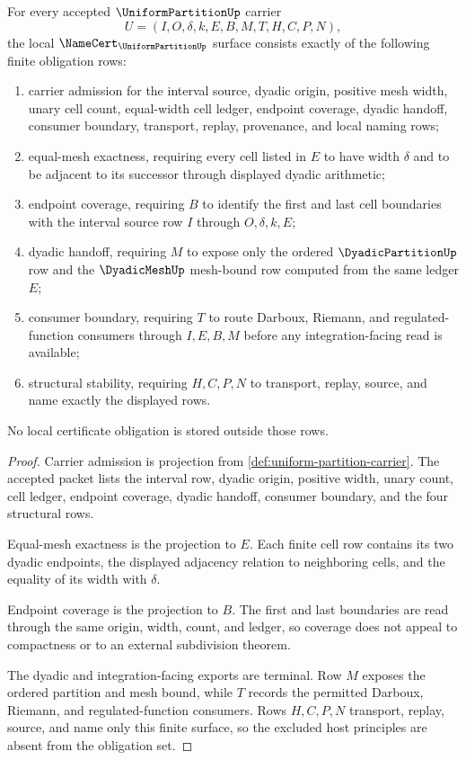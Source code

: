 \begin{theorem}
\label{thm:uniform-partition-namecert-obligations}
For every accepted $\UniformPartitionUp$ carrier
$$
U=(I,O,\delta,k,E,B,M,T,H,C,P,N),
$$
the local $\NameCert_{\UniformPartitionUp}$ surface consists exactly of the following finite obligation rows:
\begin{enumerate}
\item carrier admission for the interval source, dyadic origin, positive mesh width, unary cell count, equal-width cell ledger, endpoint coverage, dyadic handoff, consumer boundary, transport, replay, provenance, and local naming rows;
\item equal-mesh exactness, requiring every cell listed in $E$ to have width $\delta$ and to be adjacent to its successor through displayed dyadic arithmetic;
\item endpoint coverage, requiring $B$ to identify the first and last cell boundaries with the interval source row $I$ through $O,\delta,k,E$;
\item dyadic handoff, requiring $M$ to expose only the ordered $\DyadicPartitionUp$ row and the $\DyadicMeshUp$ mesh-bound row computed from the same ledger $E$;
\item consumer boundary, requiring $T$ to route Darboux, Riemann, and regulated-function consumers through $I,E,B,M$ before any integration-facing read is available;
\item structural stability, requiring $H,C,P,N$ to transport, replay, source, and name exactly the displayed rows.
\end{enumerate}
No local certificate obligation is stored outside those rows.
\end{theorem}
\begin{proof}
Carrier admission is projection from \autoref{def:uniform-partition-carrier}. The accepted packet lists the interval row, dyadic origin, positive width, unary count, cell ledger, endpoint coverage, dyadic handoff, consumer boundary, and the four structural rows.

Equal-mesh exactness is the projection to $E$. Each finite cell row contains its two dyadic endpoints, the displayed adjacency relation to neighboring cells, and the equality of its width with $\delta$.

Endpoint coverage is the projection to $B$. The first and last boundaries are read through the same origin, width, count, and ledger, so coverage does not appeal to compactness or to an external subdivision theorem.

The dyadic and integration-facing exports are terminal. Row $M$ exposes the ordered partition and mesh bound, while $T$ records the permitted Darboux, Riemann, and regulated-function consumers. Rows $H,C,P,N$ transport, replay, source, and name only this finite surface, so the excluded host principles are absent from the obligation set.
\end{proof}

